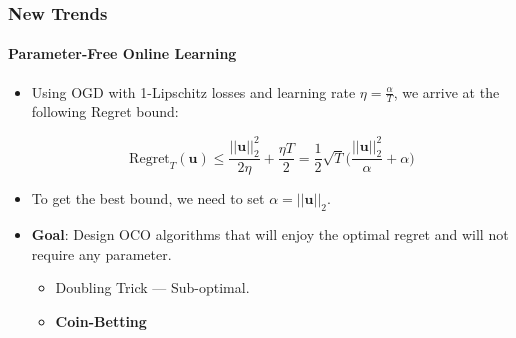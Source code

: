 \documentclass{beamer}
\newcommand{\uu}{\mathbf{u}}
\begin{document}
\begin{frame}
\frametitle{New Trends}
\framesubtitle{Parameter-Free Online Learning}

\begin{itemize}
\item Using OGD with 1-Lipschitz losses and learning rate $\eta = \frac{\alpha}{T}$, we arrive at the following Regret bound:

\begin{equation}
\mathrm{Regret}_T(\uu) \leq \frac{||\uu||_2^2}{2\eta} + \frac{\eta T}{2} = \frac{1}{2} \sqrt{T} \Big(\frac{||\uu||_2^2}{\alpha} + \alpha\Big)
\end{equation}

\item To get the best bound, we need to set $\alpha = ||\uu||_2$.

\pause	
\item \textbf{Goal}: Design OCO algorithms that will enjoy the optimal regret and will not require any parameter.

\begin{itemize}
\item Doubling Trick --- Sub-optimal.
\item \textbf{Coin-Betting}
\end{itemize}

\end{itemize}
\end{frame}
\end{document}
